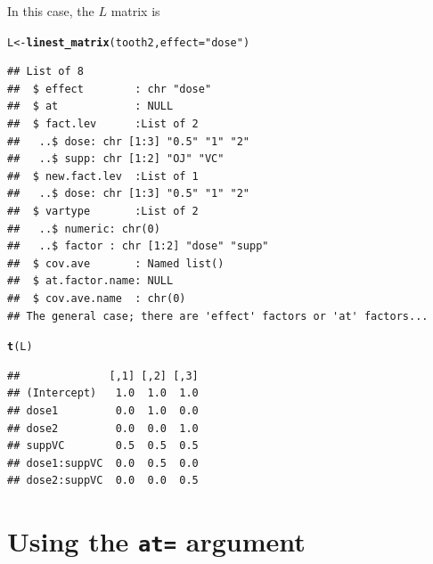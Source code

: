 \documentclass[10pt]{article}\usepackage[]{graphicx}\usepackage[]{color}
\makeatletter
\newcommand{\hlstr}[1]{\textcolor[rgb]{0.192,0.494,0.8}{#1}}%
\newcommand{\hlstd}[1]{\textcolor[rgb]{0.345,0.345,0.345}{#1}}%
\newcommand{\hlkwb}[1]{\textcolor[rgb]{0.69,0.353,0.396}{#1}}%
\newcommand{\hlkwc}[1]{\textcolor[rgb]{0.333,0.667,0.333}{#1}}%
\newcommand{\hlkwd}[1]{\textcolor[rgb]{0.737,0.353,0.396}{\textbf{#1}}}%
\newenvironment{kframe}{%
 \def\at@end@of@kframe{}%
 \ifinner\ifhmode%
  \def\at@end@of@kframe{\end{minipage}}%
  \begin{minipage}{\columnwidth}%
 \fi\fi%
 \def\FrameCommand##1{\hskip\@totalleftmargin \hskip-\fboxsep
 \colorbox{shadecolor}{##1}\hskip-\fboxsep
     \hskip-\linewidth \hskip-\@totalleftmargin \hskip\columnwidth}%
 \MakeFramed {\advance\hsize-\width
   \@totalleftmargin\z@ \linewidth\hsize
   \@setminipage}}%
 {\par\unskip\endMakeFramed%
 \at@end@of@kframe}
\newenvironment{knitrout}{}{} %
\def\code#1{\texttt{#1}}
\makeatother
\begin{document}
In this case, the $L$ matrix is
\begin{knitrout}
\color{fgcolor}\begin{kframe}
\begin{alltt}
\hlstd{L} \hlkwb{<-} \hlkwd{linest_matrix}\hlstd{(tooth2,} \hlkwc{effect}\hlstd{=}\hlstr{"dose"}\hlstd{)}
\end{alltt}
\begin{verbatim}
## List of 8
##  $ effect        : chr "dose"
##  $ at            : NULL
##  $ fact.lev      :List of 2
##   ..$ dose: chr [1:3] "0.5" "1" "2"
##   ..$ supp: chr [1:2] "OJ" "VC"
##  $ new.fact.lev  :List of 1
##   ..$ dose: chr [1:3] "0.5" "1" "2"
##  $ vartype       :List of 2
##   ..$ numeric: chr(0) 
##   ..$ factor : chr [1:2] "dose" "supp"
##  $ cov.ave       : Named list()
##  $ at.factor.name: NULL
##  $ cov.ave.name  : chr(0) 
## The general case; there are 'effect' factors or 'at' factors...
\end{verbatim}
\begin{alltt}
\hlkwd{t}\hlstd{(L)}
\end{alltt}
\begin{verbatim}
##              [,1] [,2] [,3]
## (Intercept)   1.0  1.0  1.0
## dose1         0.0  1.0  0.0
## dose2         0.0  0.0  1.0
## suppVC        0.5  0.5  0.5
## dose1:suppVC  0.0  0.5  0.0
## dose2:suppVC  0.0  0.0  0.5
\end{verbatim}
\end{kframe}
\end{knitrout}



















\section{Using the \code{at=} argument}
\label{sec:example:-chickweight}
\end{document}
